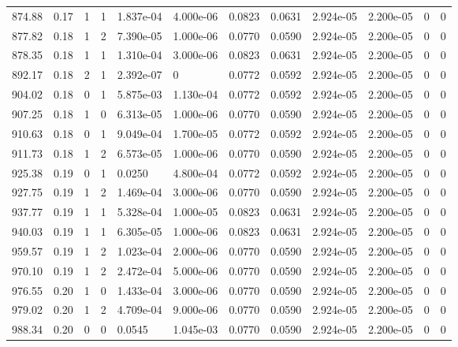 \documentclass[preview]{standalone}
\begin{document}
{{{\begin{tabular}{L{1.2cm}C{1.2cm} C{0.3cm}C{0.5cm} C{1.4cm}C{1.4cm} C{1.4cm}C{1.4cm} C{1.6cm}C{1.6cm} C{1.6cm}C{1.6cm}}
  874.88  &  0.17  & 1     &  1 &  1.837e-04  & 4.000e-06  &  0.0823&   0.0631& 2.924e-05 & 2.200e-05   &  0 & 0  \\ 
  877.82  &  0.18  & 1     &  2 &  7.390e-05  & 1.000e-06  &  0.0770&   0.0590& 2.924e-05 & 2.200e-05   &  0 & 0  \\ 
  878.35  &  0.18  & 1     &  1 &  1.310e-04  & 3.000e-06  &  0.0823&   0.0631& 2.924e-05 & 2.200e-05   &  0 & 0  \\ 
  892.17  &  0.18  & 2     &  1 &  2.392e-07  & 0  &  0.0772&   0.0592& 2.924e-05 & 2.200e-05   &  0 & 0  \\ 
  904.02  &  0.18  & 0     &  1 &  5.875e-03  & 1.130e-04  &  0.0772&   0.0592& 2.924e-05 & 2.200e-05   &  0 & 0  \\ 
  907.25  &  0.18  & 1     &  0 &  6.313e-05  & 1.000e-06  &  0.0770&   0.0590& 2.924e-05 & 2.200e-05   &  0 & 0  \\ 
  910.63  &  0.18  & 0     &  1 &  9.049e-04  & 1.700e-05  &  0.0772&   0.0592& 2.924e-05 & 2.200e-05   &  0 & 0  \\ 
  911.73  &  0.18  & 1     &  2 &  6.573e-05  & 1.000e-06  &  0.0770&   0.0590& 2.924e-05 & 2.200e-05   &  0 & 0  \\ 
  925.38  &  0.19  & 0     &  1 &  0.0250  & 4.800e-04  &  0.0772&   0.0592& 2.924e-05 & 2.200e-05   &  0 & 0  \\ 
  927.75  &  0.19  & 1     &  2 &  1.469e-04  & 3.000e-06  &  0.0770&   0.0590& 2.924e-05 & 2.200e-05   &  0 & 0  \\ 
  937.77  &  0.19  & 1     &  1 &  5.328e-04  & 1.000e-05  &  0.0823&   0.0631& 2.924e-05 & 2.200e-05   &  0 & 0  \\ 
  940.03  &  0.19  & 1     &  1 &  6.305e-05  & 1.000e-06  &  0.0823&   0.0631& 2.924e-05 & 2.200e-05   &  0 & 0  \\ 
  959.57  &  0.19  & 1     &  2 &  1.023e-04  & 2.000e-06  &  0.0770&   0.0590& 2.924e-05 & 2.200e-05   &  0 & 0  \\ 
  970.10  &  0.19  & 1     &  2 &  2.472e-04  & 5.000e-06  &  0.0770&   0.0590& 2.924e-05 & 2.200e-05   &  0 & 0  \\ 
  976.55  &  0.20  & 1     &  0 &  1.433e-04  & 3.000e-06  &  0.0770&   0.0590& 2.924e-05 & 2.200e-05   &  0 & 0  \\ 
  979.02  &  0.20  & 1     &  2 &  4.709e-04  & 9.000e-06  &  0.0770&   0.0590& 2.924e-05 & 2.200e-05   &  0 & 0  \\ 
  988.34  &  0.20  & 0     &  0 &  0.0545  & 1.045e-03  &  0.0770&   0.0590& 2.924e-05 & 2.200e-05   &  0 & 0  \\ 

\end{tabular}}}}
\end{document}
